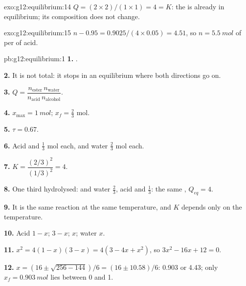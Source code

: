 \begin{solution}{exo:g12:equilibrium:14}
$Q = (2 \times 2)/(1 \times 1) = 4 = K$: the  is already in
equilibrium; its composition does not change.
\end{solution}

\begin{solution}{exo:g12:equilibrium:15}
$n - 0.95 = 0.9025 / (4 \times 0.05) = 4.51$, so $n = \qty{5.5}{mol}$ of
 per  of acid.
\end{solution}

\begin{solution}{pb:g12:equilibrium:1}
\textbf{1.} .

\textbf{2.} It is not total: it stops in an equilibrium where both
directions go on.

\textbf{3.} $Q = \dfrac{n_{\text{ester}}\, n_{\text{water}}}{n_{\text{acid}}\, n_{\text{alcohol}}}$.

\textbf{4.} $x_{\max} = \qty{1}{mol}$; $x_f = \frac{2}{3}$ mol.

\textbf{5.} $\tau = 0.67$.

\textbf{6.} Acid and  $\frac{1}{3}$ mol each,  and water
$\frac{2}{3}$ mol each.

\textbf{7.} $K = \dfrac{(2/3)^2}{(1/3)^2} = 4$.

\textbf{8.} One third hydrolysed:  and water $\frac{2}{3}$, acid
and  $\frac{1}{3}$: the same , $Q_{eq} = 4$.

\textbf{9.} It is the same reaction at the same temperature, and $K$
depends only on the temperature.

\textbf{10.} Acid $1 - x$;  $3 - x$;  $x$; water $x$.

\textbf{11.} $x^2 = 4(1 - x)(3 - x) = 4(3 - 4x + x^2)$, so
$3x^2 - 16x + 12 = 0$.

\textbf{12.} $x = (16 \pm \sqrt{256 - 144})/6 = (16 \pm 10.58)/6$: 0.903
or 4.43; only $x_f = \qty{0.903}{mol}$ lies between 0 and 1.


\end{solution}
